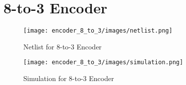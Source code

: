 \documentclass[a4paper,12pt]{report}
\begin{document}
\section*{8-to-3 Encoder}
\begin{figure}[ht!]
    \centering
    \texttt{[image: encoder\_8\_to\_3/images/netlist.png]}
    \caption{Netlist for 8-to-3 Encoder}
\end{figure}
\begin{figure}[ht!]
    \centering
    \texttt{[image: encoder\_8\_to\_3/images/simulation.png]}
    \caption{Simulation for 8-to-3 Encoder}
\end{figure}
\clearpage
\clearpage
\end{document}
